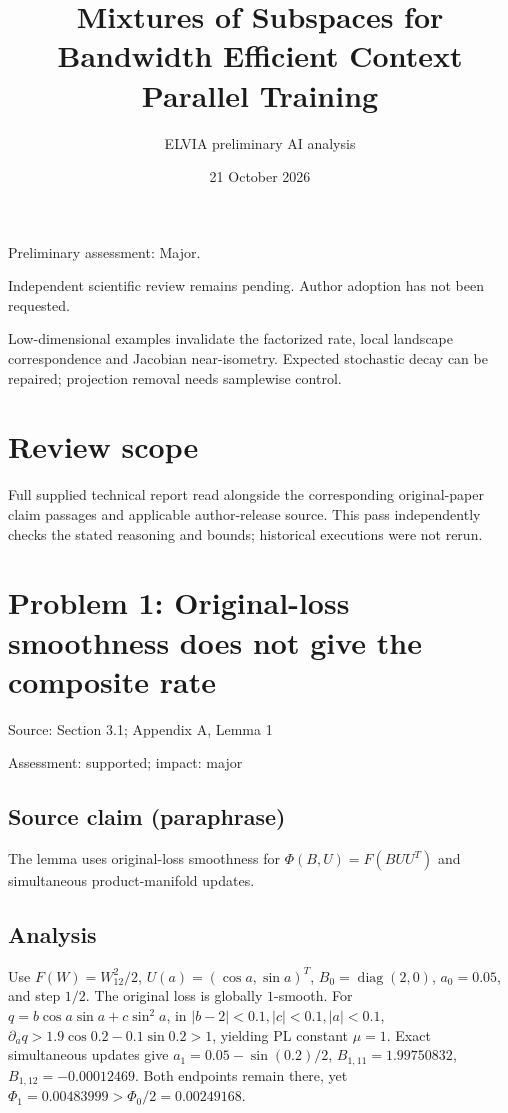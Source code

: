 \documentclass[11pt]{article}
\begin{document}
\title{Mixtures of Subspaces for Bandwidth Efficient Context Parallel Training}

\author{ELVIA preliminary AI analysis}\date{21 October 2026}\maketitle

Preliminary assessment: Major.\par

Independent scientific review remains pending. Author adoption has not been requested.

Low-dimensional examples invalidate the factorized rate, local landscape correspondence and Jacobian near-isometry. Expected stochastic decay can be repaired; projection removal needs samplewise control.

\section*{Review scope}

Full supplied technical report read alongside the corresponding original-paper claim passages and applicable author-release source. This pass independently checks the stated reasoning and bounds; historical executions were not rerun.

\section*{Problem 1: Original-loss smoothness does not give the composite rate}

Source: Section 3.1; Appendix A, Lemma 1

Assessment: supported; impact: major

\subsection*{Source claim (paraphrase)}

The lemma uses original-loss smoothness for \(\Phi(B,U)=F(BUU^T)\) and simultaneous product-manifold updates.

\subsection*{Analysis}

Use \(F(W)=W_{12}^2/2\), \(U(a)=(\cos a,\sin a)^T\), \(B_0=\operatorname{diag}(2,0)\), \(a_0=0.05\), and step \(1/2\). The original loss is globally \(1\)-smooth. For \(q=b\cos a\sin a+c\sin^2a\), in \(|b-2|<0.1,|c|<0.1,|a|<0.1\), \(\partial_aq>1.9\cos0.2-0.1\sin0.2>1\), yielding PL constant \(\mu=1\). Exact simultaneous updates give \(a_1=0.05-\sin(0.2)/2\), \(B_{1,11}=1.99750832\), \(B_{1,12}=-0.00012469\). Both endpoints remain there, yet \(\Phi_1=0.00483999>\Phi_0/2=0.00249168\).
\end{document}
